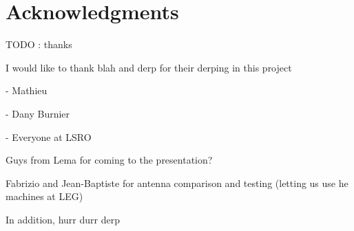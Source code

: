 




\begingroup
\let\clearpage\relax
\let\cleardoublepage\relax
\let\cleardoublepage\relax
\chapter*{Acknowledgments}

TODO : thanks

I would like to thank blah and derp for their derping in this project

- Mathieu

- Dany Burnier

- Everyone at LSRO

Guys from Lema for coming to the presentation?

Fabrizio and Jean-Baptiste for antenna comparison and testing (letting us use
he machines at LEG)


\bigskip

\noindent In addition, hurr durr derp

\endgroup



